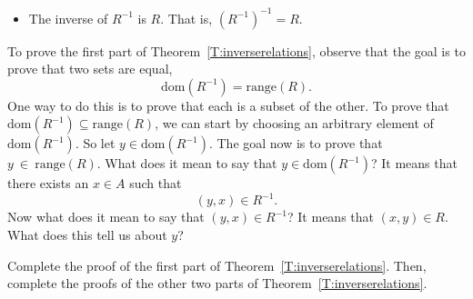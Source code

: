 \begin{enumerate}
\begin{theorem}
\begin{itemize}
\item The inverse of  $R^{ - 1} $  is  $R$.  That is, $\left( {R^{ - 1} } \right)^{ - 1}  = R$.  \label{T:inverserelations3}
\end{itemize}
\end{theorem}
To prove the first part of \label{exer:provinginverse}
Theorem~\ref{T:inverserelations}, observe that the goal is to prove that two sets are equal, 
\[
\text{dom}\!\left( {R^{ - 1} } \right) = \text{range}( R ).
\]
One way to do this is to prove that each is a subset of the other.  %
To prove that  $\text{dom}\!\left( {R^{ - 1} } \right) \subseteq \text{range}( R )$, we can start by choosing an arbitrary element of  $\text{dom}\!\left( {R^{ - 1} } \right)$.  So let  
$y \in \text{dom}\!\left( {R^{ - 1} } \right)$.  The goal now is to prove that 
$y~\in~\text{range}( R )$.  What does it mean to say that  
$y \in \text{dom}\!\left( {R^{ - 1} } \right)$?  It means that there exists an  $x \in A$  such that
\[
\left( {y, x} \right) \in R^{ - 1}. 
\]
Now what does it mean to say that  $( {y, x} ) \in R^{ - 1} $?  It means that  
$( {x, y} ) \in R$.  What does this tell us about  $y$?

Complete the proof of the first part of Theorem~\ref{T:inverserelations}.  Then, complete the proofs of the other two parts of Theorem~\ref{T:inverserelations}.

\end{enumerate}


\hbreak


\endinput

